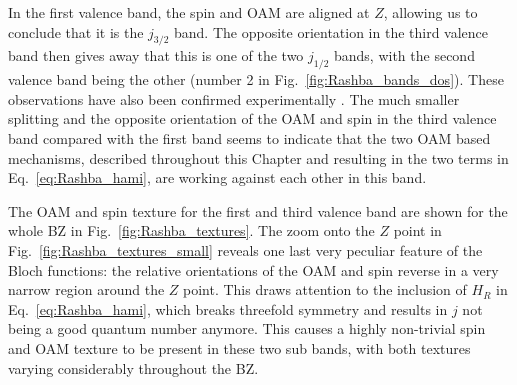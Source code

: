 In the first valence band, the spin and OAM are aligned at $Z$, allowing us to conclude that it is the $j_{3/2}$ band. The opposite orientation in the third valence band then gives away that this is one of the two $j_{1/2}$ bands, with the second valence band being the other (number 2 in Fig.~\ref{fig:Rashba_bands_dos}).
These observations have also been confirmed experimentally \cite{Krempasky2015,Krempasky2020}.
The much smaller splitting and the opposite orientation of the OAM and spin in the third valence band compared with the first band seems to indicate that the two OAM based mechanisms, described throughout this Chapter and resulting in the two terms in Eq.~\eqref{eq:Rashba_hami}, are working against each other in this band.

The OAM and spin texture for the first and third valence band are shown for the whole BZ in Fig.~\ref{fig:Rashba_textures}.
The zoom onto the $Z$ point in Fig.~\ref{fig:Rashba_textures_small} reveals one last very peculiar feature of the Bloch functions: the relative orientations of the OAM and spin reverse in a very narrow region around the $Z$ point.
This draws attention to the inclusion of $H_R$ in Eq.~\eqref{eq:Rashba_hami}, which breaks threefold symmetry and results in $j$ not being a good quantum number anymore. This causes a highly non-trivial spin and OAM texture to be present in these two sub bands, with both textures varying considerably throughout the BZ. 
